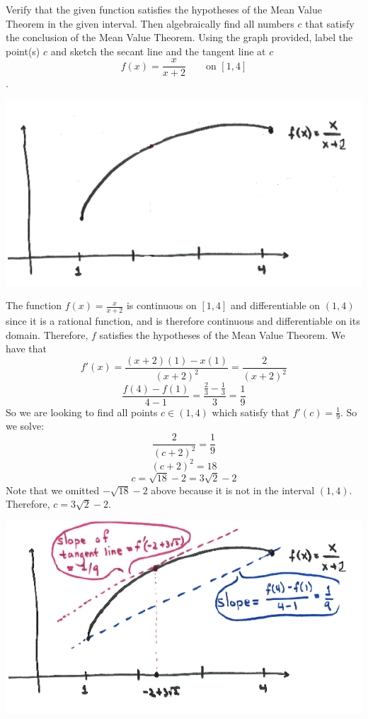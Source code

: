 \documentclass[nooutcomes]{ximera}
\begin{document}
\begin{problem}
  Verify that the given function satisfies the hypotheses of the Mean Value Theorem in the given interval.
  Then algebraically find all numbers $c$ that satisfy the conclusion of the Mean Value Theorem.
  Using the graph provided, label the point(s) $c$ and sketch the secant line and the tangent line at $c$
  $$ f(x) = \frac{x}{x+2} \qquad \text{on } [1,4] $$.
  \begin{image}
    \includegraphics[scale=0.5]{Images/Figure3.png}
  \end{image}
  \begin{freeResponse}
    The function $f(x) = \frac{x}{x+2}$ is continuous on $[1,4]$ and differentiable on $(1,4)$ since it is a rational function, and is therefore continuous and differentiable on its domain.
    Therefore, $f$ satisfies the hypotheses of the Mean Value Theorem.
    We have that
    $$ f'(x) = \frac{(x+2)(1) - x(1)}{(x+2)^2} = \frac{2}{(x+2)^2} $$
    $$ \frac{f(4) - f(1)}{4-1} = \frac{\frac{2}{3} - \frac{1}{3}}{3} = \frac{1}{9} $$
    So we are looking to find all points $c \in (1,4)$ which satisfy that $ f'(c) = \frac{1}{9} $.  So we solve:
    $$ \frac{2}{(c+2)^2} = \frac{1}{9} $$
    $$ (c+2)^2 = 18 $$
    $$ c = \sqrt{18} - 2 = 3\sqrt{2} - 2 $$
    Note that we omitted $-\sqrt{18} - 2$ above because it is not in the interval $(1,4)$.  Therefore, $c = 3\sqrt{2} - 2$.
       \begin{image}
      \includegraphics[scale=0.5]{Images/Figure4.png}
    \end{image}
  \end{freeResponse}
\end{problem}
\end{document}
